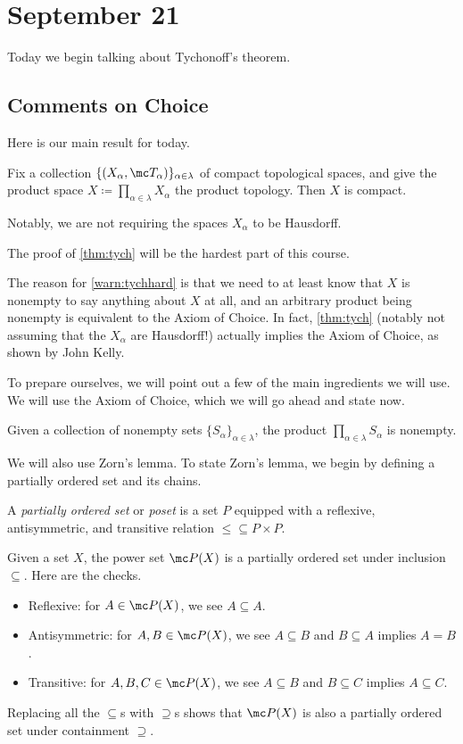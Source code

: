 \documentclass[../notes.tex]{subfiles}
\begin{document}
\section{September 21}

Today we begin talking about Tychonoff's theorem.

\subsection{Comments on Choice}
Here is our main result for today.
\begin{theorem}[Tychonoff] \label{thm:tych}
	Fix a collection $\{(X_\alpha,\mc T_\alpha)\}_{\alpha\in\lambda}$ of compact topological spaces, and give the product space $X\coloneqq\prod_{\alpha\in\lambda}X_\alpha$ the product topology. Then $X$ is compact.
\end{theorem}
Notably, we are not requiring the spaces $X_\alpha$ to be Hausdorff.
\begin{warn} \label{warn:tychhard}
	The proof of \autoref{thm:tych} will be the hardest part of this course.
\end{warn}
\begin{remark}
	The reason for \autoref{warn:tychhard} is that we need to at least know that $X$ is nonempty to say anything about $X$ at all, and an arbitrary product being nonempty is equivalent to the Axiom of Choice. In fact, \autoref{thm:tych} (notably not assuming that the $X_\alpha$ are Hausdorff!) actually implies the Axiom of Choice, as shown by John Kelly.
\end{remark}
To prepare ourselves, we will point out a few of the main ingredients we will use. We will use the Axiom of Choice, which we will go ahead and state now.
\begin{ax}[Choice]
	Given a collection of nonempty sets $\{S_\alpha\}_{\alpha\in\lambda}$, the product $\prod_{\alpha\in\lambda}S_\alpha$ is nonempty.
\end{ax}
We will also use Zorn's lemma. To state Zorn's lemma, we begin by defining a partially ordered set and its chains.
\begin{definition}[Poset]
	A \textit{partially ordered set} or \textit{poset} is a set $P$ equipped with a reflexive, antisymmetric, and transitive relation ${\le}\subseteq P\times P$.
\end{definition}
\begin{example} \label{ex:subsetsposet}
	Given a set $X$, the power set $\mc P(X)$ is a partially ordered set under inclusion $\subseteq$. Here are the checks.
	\begin{itemize}
		\item Reflexive: for $A\in\mc P(X)$, we see $A\subseteq A$.
		\item Antisymmetric: for $A,B\in\mc P(X)$, we see $A\subseteq B$ and $B\subseteq A$ implies $A=B$.
		\item Transitive: for $A,B,C\in\mc P(X)$, we see $A\subseteq B$ and $B\subseteq C$ implies $A\subseteq C$.
	\end{itemize}
	Replacing all the $\subseteq$s with $\supseteq$s shows that $\mc P(X)$ is also a partially ordered set under containment $\supseteq$.
\end{example}
\end{document}
